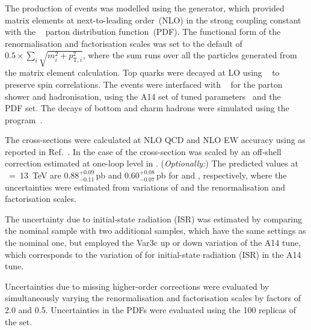 The production of \ttV events was modelled using the \MGNLO[2.3.3]
\cite{Alwall:2014hca} generator, which provided matrix elements at
next-to-leading order~(NLO) in the strong coupling constant \alphas
with the \NNPDF[3.0nlo]~\cite{Ball:2014uwa} parton distribution
function~(PDF). The functional form of the renormalisation and
factorisation scales was set to the default of $0.5 \times \sum_i
\sqrt{m^2_i+p^2_{\text{T},i}}$, where the sum runs over all the particles
generated from the matrix element calculation. Top quarks were decayed
at LO using \MADSPIN~\cite{Frixione:2007zp,Artoisenet:2012st} to
preserve spin correlations. The events were interfaced with
\PYTHIA[8.210]~\cite{Sjostrand:2014zea} for the parton shower and
hadronisation, using the A14 set of tuned
parameters~\cite{ATL-PHYS-PUB-2014-021} and the
\NNPDF[2.3lo]~\cite{Ball:2014uwa} PDF set.  
The decays of bottom and charm hadrons were simulated using the \EVTGEN[1.2.0] program~\cite{Lange:2001uf}. 

The cross-sections were calculated at NLO QCD and NLO EW accuracy using
\MGNLO as reported in Ref.~\cite{deFlorian:2016spz}.
In the case of \ttll the cross-section was scaled by 
an off-shell correction estimated at one-loop level in \alphas.
(\emph{Optionally:})
The predicted values at \rts~=~\SI{13}{\TeV} are 0.88$^{+0.09}_{-0.11}$\,pb and
0.60$^{+0.08}_{-0.07}$\,pb for \ttZ and \ttW, respectively, where the
uncertainties were estimated from variations of \alphas and the renormalisation and
factorisation scales.

The uncertainty due to initial-state radiation (ISR) was estimated by
comparing the nominal \ttV sample with two additional samples, which
have the same settings as the nominal one, but employed the Var3c up or down
variation of the A14 tune, which corresponds
to the variation of \alphas for initial-state radiation
(ISR) in the A14 tune.

Uncertainties due to missing higher-order corrections were evaluated
by simultaneously varying the renormalisation and factorisation scales
by factors of 2.0 and 0.5. Uncertainties in the PDFs
were evaluated using the 100 replicas of the \NNPDF[3.0nlo] set.


\subsubsection[Sherpa]{\SHERPA}
\label{subsubsec:ttV_sherpa}

